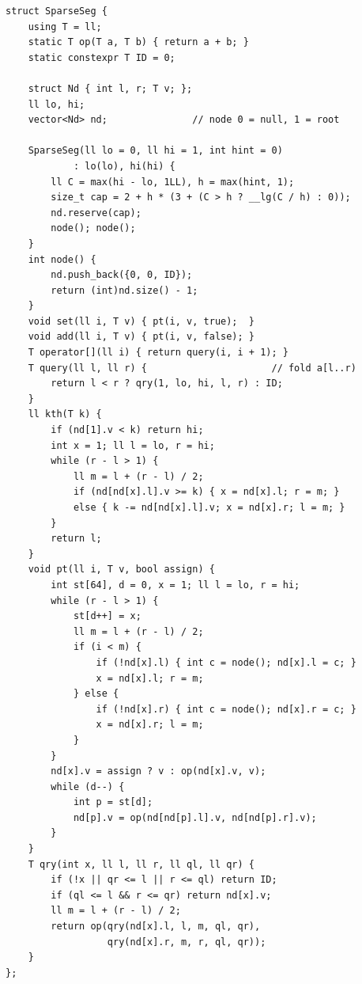 \begin{lstlisting}
struct SparseSeg {
    using T = ll;
    static T op(T a, T b) { return a + b; }
    static constexpr T ID = 0;

    struct Nd { int l, r; T v; };
    ll lo, hi;
    vector<Nd> nd;               // node 0 = null, 1 = root

    SparseSeg(ll lo = 0, ll hi = 1, int hint = 0)
            : lo(lo), hi(hi) {
        ll C = max(hi - lo, 1LL), h = max(hint, 1);
        size_t cap = 2 + h * (3 + (C > h ? __lg(C / h) : 0));
        nd.reserve(cap);
        node(); node();
    }
    int node() {
        nd.push_back({0, 0, ID});
        return (int)nd.size() - 1;
    }
    void set(ll i, T v) { pt(i, v, true);  }
    void add(ll i, T v) { pt(i, v, false); }
    T operator[](ll i) { return query(i, i + 1); }
    T query(ll l, ll r) {                      // fold a[l..r)
        return l < r ? qry(1, lo, hi, l, r) : ID;
    }
    ll kth(T k) {
        if (nd[1].v < k) return hi;
        int x = 1; ll l = lo, r = hi;
        while (r - l > 1) {
            ll m = l + (r - l) / 2;
            if (nd[nd[x].l].v >= k) { x = nd[x].l; r = m; }
            else { k -= nd[nd[x].l].v; x = nd[x].r; l = m; }
        }
        return l;
    }
    void pt(ll i, T v, bool assign) {
        int st[64], d = 0, x = 1; ll l = lo, r = hi;
        while (r - l > 1) {
            st[d++] = x;
            ll m = l + (r - l) / 2;
            if (i < m) {
                if (!nd[x].l) { int c = node(); nd[x].l = c; }
                x = nd[x].l; r = m;
            } else {
                if (!nd[x].r) { int c = node(); nd[x].r = c; }
                x = nd[x].r; l = m;
            }
        }
        nd[x].v = assign ? v : op(nd[x].v, v);
        while (d--) {
            int p = st[d];
            nd[p].v = op(nd[nd[p].l].v, nd[nd[p].r].v);
        }
    }
    T qry(int x, ll l, ll r, ll ql, ll qr) {
        if (!x || qr <= l || r <= ql) return ID;
        if (ql <= l && r <= qr) return nd[x].v;
        ll m = l + (r - l) / 2;
        return op(qry(nd[x].l, l, m, ql, qr),
                  qry(nd[x].r, m, r, ql, qr));
    }
};
\end{lstlisting}

